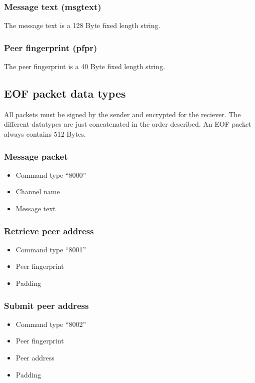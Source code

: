 \documentclass[12pt,a4paper]{article}
\begin{document}
\subsubsection{Message text (msgtext)}
The message text is a 128 Byte fixed length string.
\subsubsection{Peer fingerprint (pfpr)}
The peer fingerprint is a 40 Byte fixed length string.
\subsection{EOF packet data types}
All packets must be signed by the sender and encrypted for the reciever.
The different datatypes are just concatenated in the order
described.
An EOF packet always contains 512 Bytes.
\subsubsection{Message packet}
\begin{itemize}
\item Command type "`8000"'
\item Channel name
\item Message text
\end{itemize}
\subsubsection{Retrieve peer address}
\begin{itemize}
\item Command type "`8001"'
\item Peer fingerprint
\item Padding
\end{itemize}
\subsubsection{Submit peer address}
\begin{itemize}
\item Command type "`8002"'
\item Peer fingerprint
\item Peer address
\item Padding
\end{itemize}
\end{document}
